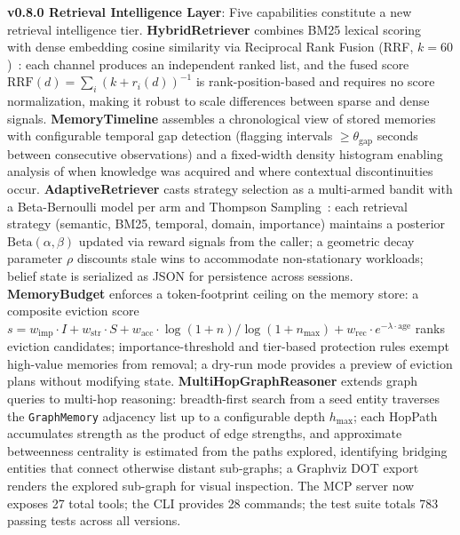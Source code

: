 \documentclass[conference]{IEEEtran}
\begin{document}
\textbf{v0.8.0 Retrieval Intelligence Layer}: Five capabilities constitute a new retrieval intelligence tier. \textbf{HybridRetriever} combines BM25 lexical scoring~\cite{robertson1994okapi} with dense embedding cosine similarity via Reciprocal Rank Fusion (RRF, $k{=}60$)~\cite{cormack2009reciprocal}: each channel produces an independent ranked list, and the fused score $\text{RRF}(d) = \sum_i (k + r_i(d))^{-1}$ is rank-position-based and requires no score normalization, making it robust to scale differences between sparse and dense signals. \textbf{MemoryTimeline} assembles a chronological view of stored memories with configurable temporal gap detection (flagging intervals $\geq \theta_{\text{gap}}$ seconds between consecutive observations) and a fixed-width density histogram enabling analysis of when knowledge was acquired and where contextual discontinuities occur. \textbf{AdaptiveRetriever} casts strategy selection as a multi-armed bandit with a Beta-Bernoulli model per arm and Thompson Sampling~\cite{thompson1933likelihood}: each retrieval strategy (semantic, BM25, temporal, domain, importance) maintains a posterior $\text{Beta}(\alpha, \beta)$ updated via reward signals from the caller; a geometric decay parameter $\rho$ discounts stale wins to accommodate non-stationary workloads; belief state is serialized as JSON for persistence across sessions. \textbf{MemoryBudget} enforces a token-footprint ceiling on the memory store: a composite eviction score $s = w_{\text{imp}} \cdot I + w_{\text{str}} \cdot S + w_{\text{acc}} \cdot \log(1 + n) / \log(1+n_{\max}) + w_{\text{rec}} \cdot e^{-\lambda \cdot \text{age}}$ ranks eviction candidates; importance-threshold and tier-based protection rules exempt high-value memories from removal; a dry-run mode provides a preview of eviction plans without modifying state. \textbf{MultiHopGraphReasoner} extends graph queries to multi-hop reasoning: breadth-first search from a seed entity traverses the \texttt{GraphMemory} adjacency list up to a configurable depth $h_{\max}$; each HopPath accumulates strength as the product of edge strengths, and approximate betweenness centrality is estimated from the paths explored, identifying bridging entities that connect otherwise distant sub-graphs; a Graphviz DOT export renders the explored sub-graph for visual inspection. The MCP server now exposes 27 total tools; the CLI provides 28 commands; the test suite totals 783 passing tests across all versions.
\end{document}
